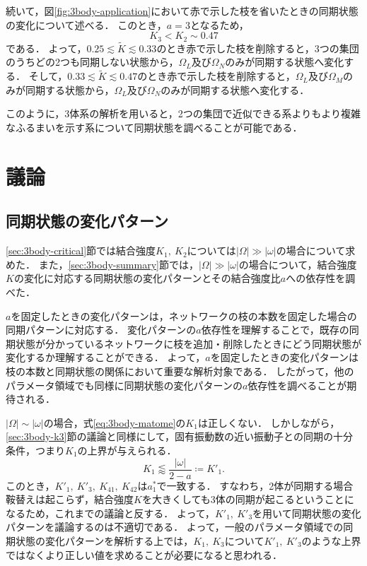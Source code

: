 \documentclass[../main]{subfiles}
\begin{document}
続いて，図\ref{fig:3body-application}において赤で示した枝を省いたときの同期状態の変化について述べる．
このとき，$a=3$となるため，
\begin{equation*}
    K_3<K_2\sim 0.47
\end{equation*}
である．
よって，$0.25\lesssim \tilde{K}\lesssim 0.33$のとき赤で示した枝を削除すると，3つの集団のうちどの2つも同期しない状態から，$\Omega_L$及び$\Omega_N$のみが同期する状態へ変化する．
そして，$0.33\lesssim \tilde{K}\lesssim 0.47$のとき赤で示した枝を削除すると，$\Omega_L$及び$\Omega_M$のみが同期する状態から，$\Omega_L$及び$\Omega_N$のみが同期する状態へ変化する．

このように，3体系の解析を用いると，2つの集団で近似できる系よりもより複雑なふるまいを示す系について同期状態を調べることが可能である．


\section{議論}
\label{sec:3body-discussion}
\subsection{同期状態の変化パターン}
\ref{sec:3body-critical}節では結合強度$K_1,\ K_2$については$|\Omega|\gg|\omega|$の場合について求めた．
また，\ref{sec:3body-summary}節では，$|\Omega|\gg|\omega|$の場合について，結合強度$K$の変化に対応する同期状態の変化パターンとその結合強度比$a$への依存性を調べた．

$a$を固定したときの変化パターンは，ネットワークの枝の本数を固定した場合の同期パターンに対応する．
変化パターンの$a$依存性を理解することで，既存の同期状態が分かっているネットワークに枝を追加・削除したときにどう同期状態が変化するか理解することができる．
よって，$a$を固定したときの変化パターンは枝の本数と同期状態の関係において重要な解析対象である．
したがって，他のパラメータ領域でも同様に同期状態の変化パターンの$a$依存性を調べることが期待される．

$|\Omega|\sim|\omega|$の場合，式\eqref{eq:3body-matome}の$K_1$は正しくない．
しかしながら，\ref{sec:3body-k3}節の議論と同様にして，固有振動数の近い振動子との同期の十分条件，つまり$K_1$の上界が与えられる．
\begin{equation}
    \label{K1-approx-dash}
    K_1\lessapprox\frac{|\omega|}{2-a}\coloneqq K'_1.
\end{equation}
このとき，$K'_1,\ K'_3,\ K_{41},\ K_{42}$は$a^\ast_1$で一致する．
すなわち，2体が同期する場合鞍替えは起こらず，結合強度$K$を大きくしても3体の同期が起こるということになるため，これまでの議論と反する．
よって，$K'_1,\ K'_3$を用いて同期状態の変化パターンを議論するのは不適切である．
よって，一般のパラメータ領域での同期状態の変化パターンを解析する上では，$K_1,\ K_3$について$K'_1,\ K'_3$のような上界ではなくより正しい値を求めることが必要になると思われる．
\end{document}

